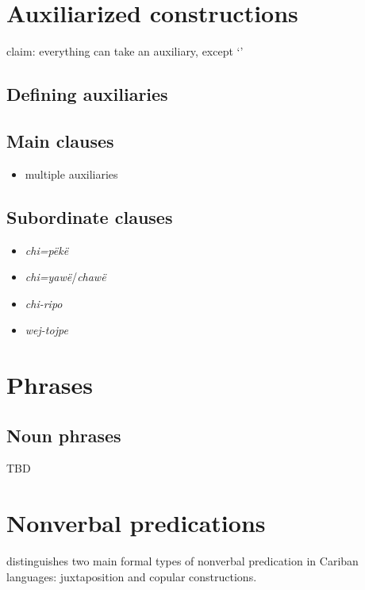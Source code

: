 \documentclass{memoir}
\begin{document}
\chapter{Auxiliarized constructions}

claim: everything can take an auxiliary, except  `'

\section{Defining auxiliaries}

\section{Main clauses}

\begin{itemize}
\tightlist
\item
  multiple auxiliaries
\end{itemize}

\section{Subordinate clauses}

\begin{itemize}
\tightlist
\item
  \emph{chi=pëkë}
\item
  \emph{chi=yawë}/\emph{chawë}
\item
  \emph{chi-ripo}
\item
  \emph{wej-tojpe}
\end{itemize}

\chapter{\texorpdfstring{Phrases \label{phrases}}{Phrases }}

\section{\texorpdfstring{Noun phrases
\label{sec:nounphrases}}{Noun phrases }}

TBD

\chapter{\texorpdfstring{Nonverbal predications
\label{nonverbal}}{Nonverbal predications }}

\textcites[366]{gildea2018reconstructing} distinguishes two main formal
types of nonverbal predication in Cariban languages: juxtaposition and
copular constructions.
\end{document}
